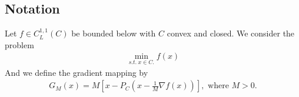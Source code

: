 \documentclass{ExerciseSheet}
\begin{document}


\subsection*{Notation}
\vskip 0.5cm 
\begin{problem}
     Let $f\in C^{1,1}_L(C)$ be bounded below with $C$ convex and closed. We consider the problem
     \begin{align}\label{problem}
         \min_{s.t.~x\in C.}f(x)
     \end{align}
     And we define the gradient mapping by
    \begin{align*}
        G_M(x) = M\left[ x - P_C\left(x - \frac{1}{M}\nabla f(x) \right) \right], \text{ where $M>0.$}
    \end{align*}
   
    \begin{enumerate}
	
      

\end{enumerate}
\end{problem}
\end{document}
